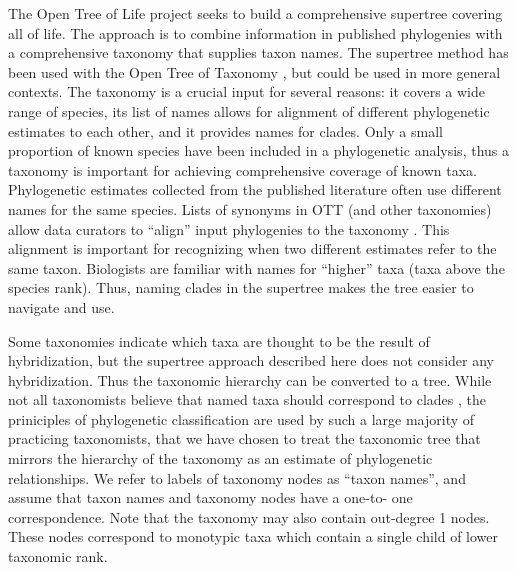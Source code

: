 \documentclass[english]{article}
\begin{document}
The Open Tree of Life project \citep{HinchliffEtAl2015} seeks to build
a comprehensive supertree \citep[see][]{redelings2017supertree}
covering all of life.
The approach is to combine information in
published phylogenies with a comprehensive taxonomy that supplies
taxon names.
The supertree method has been used with the Open Tree of
Taxonomy \citep[OTT hereafter, see][]{rees2017automated}, but 
could be used in more general contexts.
The taxonomy is a crucial input for several
reasons: it covers a wide range of species, its list of names allows
for alignment of different phylogenetic estimates to each other, and
it provides names for clades.
Only a small proportion of known species
have been included in a phylogenetic analysis, thus a taxonomy is
important for achieving comprehensive coverage of known taxa.
Phylogenetic estimates collected from the published literature often
use different names for the same species.
Lists of synonyms in OTT
(and other taxonomies) allow data curators to ``align'' input
phylogenies to the taxonomy \citep[see][ for discussion of the
curation process that the Open Tree of Life project uses to align phylogenetic
estimates to OTT]{McTavishEtAt2015}.
This alignment is important for recognizing when two different
estimates refer to the same taxon.
Biologists are familiar with names
for ``higher'' taxa (taxa above the species rank).
Thus, naming clades
in the supertree makes the tree easier to navigate and use.

Some taxonomies indicate which taxa are thought to be the result of hybridization, 
but the supertree approach
described here does not consider any hybridization.
Thus the taxonomic
hierarchy can be converted to a tree.
While not all taxonomists
believe that named taxa should correspond to clades \citep[see, for
example,][]{HorandlS2010}, the priniciples of phylogenetic
classification are used by such a large majority of practicing
taxonomists, that we have chosen to treat the taxonomic tree that
mirrors the hierarchy of the taxonomy as an estimate of phylogenetic
relationships.
We refer to labels of taxonomy nodes as ``taxon
names'', and assume that taxon names and taxonomy nodes have a one-to-
one correspondence.
Note that the taxonomy may also contain out-degree
1 nodes.
These nodes correspond to monotypic taxa which contain a
single child of lower taxonomic rank.
\end{document}
